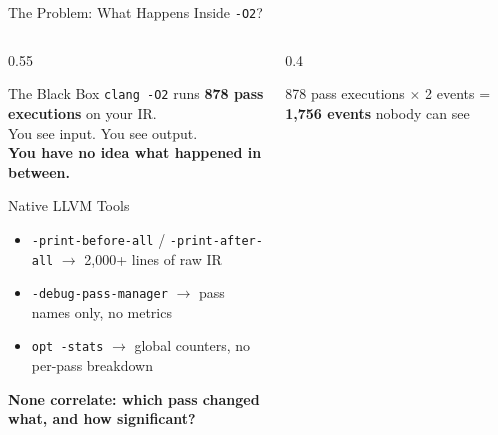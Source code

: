 \documentclass[aspectratio=169]{beamer}
\begin{document}
\begin{frame}{The Problem: What Happens Inside \texttt{-O2}?}
  \begin{columns}[T,onlytextwidth]
    \begin{column}{0.55\textwidth}
      \begin{block}{The Black Box}
        \texttt{clang -O2} runs \textbf{878 pass executions} on your IR.\\
        You see input. You see output.\\
        \textbf{You have no idea what happened in between.}
      \end{block}
      \begin{alertblock}{Native LLVM Tools}
        \begin{itemize}
          \item \texttt{-print-before-all} / \texttt{-print-after-all} $\to$ 2,000+ lines of raw IR
          \item \texttt{-debug-pass-manager} $\to$ pass names only, no metrics
          \item \texttt{opt -stats} $\to$ global counters, no per-pass breakdown
        \end{itemize}
        \textbf{None correlate: which pass changed what, and how significant?}
      \end{alertblock}
    \end{column}
    \begin{column}{0.4\textwidth}
      \centering
      \vspace{1em}
      \small 878 pass executions $\times$ 2 events = \textbf{1,756 events} nobody can see
    \end{column}
  \end{columns}
\end{frame}
\end{document}
